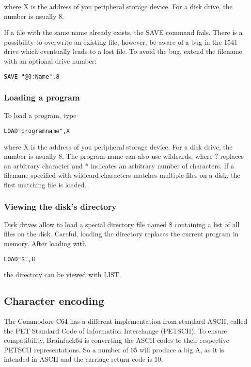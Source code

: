 \documentclass[ms,article,a4paper]{memoir}
\begin{document}
where X is the address of you peripheral storage device. For a disk drive, the number is usually 8.

If a file with the same name already exists, the SAVE command fails. There is a possibility to overwrite an existing file, however, be aware of a bug in the 1541 drive which eventually leads to a lost file. To avoid the bug, extend the filename with an optional drive number:

\begin{verbatim}
SAVE "@0:Name",8
\end{verbatim}

\subsubsection{Loading a program}

To load a program, type

\begin{verbatim}
LOAD"programname",X
\end{verbatim}

where X is the address of you peripheral storage device. For a disk drive, the number is usually 8. The program name can also use wildcards, where ? replaces an arbitrary character and * indicates an arbitrary number of characters. If a filename specified with wildcard characters matches multiple files on a disk, the first matching file is loaded.

\subsubsection{Viewing the disk's directory}

Disk drives allow to load a special directory file named \$ containing a list of all files on the disk. Careful, loading the directory replaces the current program in memory. After loading with

\begin{verbatim}
LOAD"$",8
\end{verbatim}

the directory can be viewed with LIST.

\subsection{Character encoding}

The Commodore C64 has a different implementation from standard ASCII, called the PET Standard Code of Information Interchange (PETSCII). To ensure compatibility, Brainfuck64 is converting the ASCII codes to their respective PETSCII representations. So a number of 65 will produce a big A, as it is intended in ASCII and the carriage return code is 10.
\end{document}
